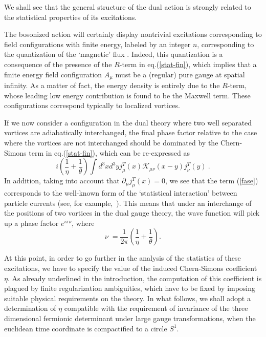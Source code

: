 \documentclass[a4paper,12pt]{article}
\begin{document}
We shall see that the general structure of the dual action is strongly
related to the statistical properties of its excitations.

The bosonized action will certainly display nontrivial excitations
corresponding to field configurations with finite energy, labeled by
an integer $n$, corresponding to the quantization of the `magnetic'
flux {\cite{kov}}. Indeed, this quantization is a consequence of the presence of
the $R$-term in eq.(\ref{stat-fin}), which implies that a finite
energy field configuration $A_\mu$ must be a (regular) pure gauge at
spatial infinity. As a matter of fact, the energy density is entirely
due to the $R$-term, whose leading low energy contribution is found to
be the Maxwell term. These configurations correspond typically to
localized vortices.



If we now consider a configuration in the dual theory where two well
separated vortices are adiabatically interchanged, the final phase
factor relative to the case where the vortices are not interchanged
should be dominated by the Chern-Simons term in eq.(\ref{stat-fin}),
which can be re-expressed as
\begin{equation}
i(\frac{1}{\eta}+\frac{1}{\theta})\int d^3x d^3y j_\mu^T(x) {\mathcal K}_{\mu\nu}(x-y) j_\nu^T(y)~.
\label{fase}
\end{equation}
In addition, taking into account that $\partial_\mu j_\mu^T(x)=0$, we see
that the term (\ref{fase}) corresponds to the well-known form of the
`statistical interaction' between particle currents (see, for
example,~\cite{lerda}). This means that under an interchange of the
positions of two vortices in the dual gauge theory, the wave function
will pick up a phase factor $e^{i \pi \nu}$, where
\begin{equation}
  \label{eq:stat}
  \nu \;= \frac{1}{2\pi}(\frac{1}{\eta}+\frac{1}{\theta}).
\end{equation}

At this point, in order to go further in the analysis of the
statistics of these excitations, we have to specify the value of the
induced Chern-Simons coefficient $\eta$. As already underlined in the
introduction, the computation of this coefficient is plagued by finite
regularization ambiguities, which have to be fixed by imposing
suitable physical requirements on the theory. In what follows, we
shall adopt a determination of $\eta$ compatible with the requirement of
invariance of the three dimensional fermionic determinant under large
gauge transformations, when the euclidean time coordinate is
compactified to a circle $S^1$\cite{large}.
\end{document}
